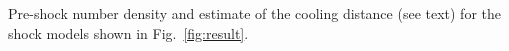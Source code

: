 \label{fig:rhocool}
Pre-shock number density and estimate of the cooling distance (see text) for the shock models shown in Fig.~\ref{fig:result}.